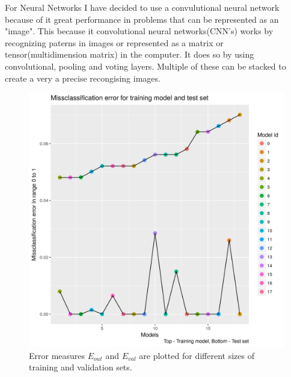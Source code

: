 For Neural Networks I have decided to use a convulutional neural network because of
it great performance in problems that can be represented as an "image". This because it
convolutional neural networks(CNN's) works by recognizing paterns in images or represented as
a matrix or tensor(multidimension matrix) in the computer. It does so by using convolutional,
pooling and voting layers. Multiple of these can be stacked to create a very a precise recongising
images.

\begin{figure}[H]
    \centering
        \includegraphics[width =.9\linewidth]{../R_scripts/Neural_Networks/results_NN/per_class_error.png}
    \caption{Error measures $E_{out}$ and $E_{val}$ are plotted for different sizes of training and validation sets.}
  \label{plot:1ii}
\end{figure}
